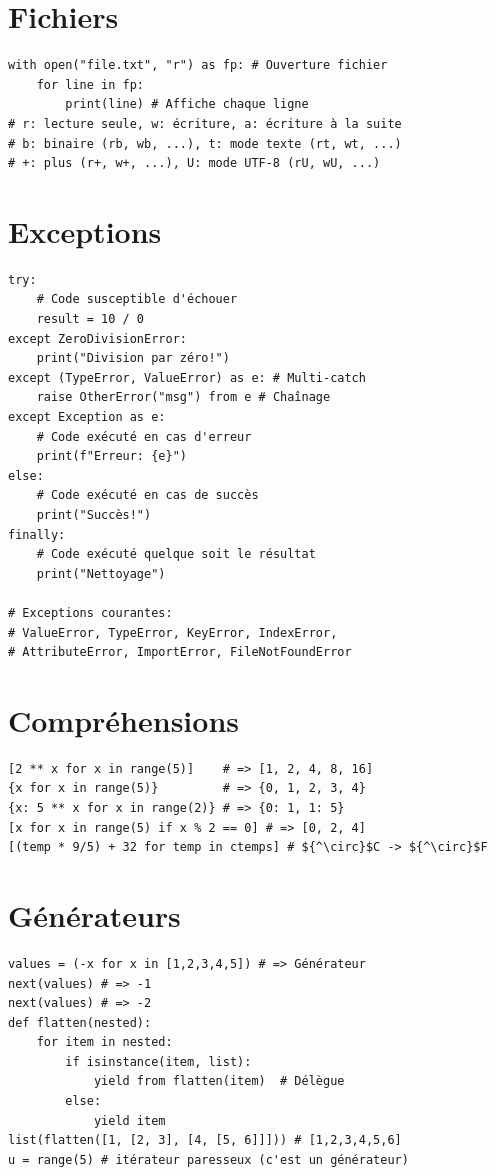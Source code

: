 \documentclass{article}
\begin{document}
\begin{multicols*}{4}
\section*{Fichiers}
\begin{lstlisting}
with open("file.txt", "r") as fp: # Ouverture fichier
    for line in fp:
        print(line) # Affiche chaque ligne
# r: lecture seule, w: écriture, a: écriture à la suite
# b: binaire (rb, wb, ...), t: mode texte (rt, wt, ...)
# +: plus (r+, w+, ...), U: mode UTF-8 (rU, wU, ...)
\end{lstlisting}

\section*{Exceptions}
\begin{lstlisting}
try:
    # Code susceptible d'échouer
    result = 10 / 0
except ZeroDivisionError:
    print("Division par zéro!")
except (TypeError, ValueError) as e: # Multi-catch
    raise OtherError("msg") from e # Chaînage
except Exception as e:
    # Code exécuté en cas d'erreur
    print(f"Erreur: {e}")
else:
    # Code exécuté en cas de succès
    print("Succès!")
finally:
    # Code exécuté quelque soit le résultat
    print("Nettoyage")

# Exceptions courantes:
# ValueError, TypeError, KeyError, IndexError,
# AttributeError, ImportError, FileNotFoundError
\end{lstlisting}

\section*{Compréhensions}
\begin{lstlisting}[mathescape]
[2 ** x for x in range(5)]    # => [1, 2, 4, 8, 16]
{x for x in range(5)}         # => {0, 1, 2, 3, 4}
{x: 5 ** x for x in range(2)} # => {0: 1, 1: 5}
[x for x in range(5) if x % 2 == 0] # => [0, 2, 4]
[(temp * 9/5) + 32 for temp in ctemps] # ${^\circ}$C -> ${^\circ}$F
\end{lstlisting}

\section*{Générateurs}
\begin{lstlisting}
values = (-x for x in [1,2,3,4,5]) # => Générateur
next(values) # => -1
next(values) # => -2
def flatten(nested):
    for item in nested:
        if isinstance(item, list):
            yield from flatten(item)  # Délègue
        else:
            yield item
list(flatten([1, [2, 3], [4, [5, 6]]])) # [1,2,3,4,5,6]
u = range(5) # itérateur paresseux (c'est un générateur)
\end{lstlisting}


\end{multicols*}
\end{document}

